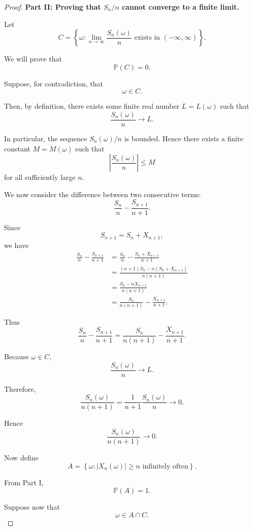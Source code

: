 \begin{proof}
\medskip

\noindent
\textbf{Part II: Proving that $S_n/n$ cannot converge to a finite limit.}

Let
\[
    C
    =
    \left\{
        \omega:
        \lim_{n\to\infty}\frac{S_n(\omega)}{n}
        \text{ exists in }(-\infty,\infty)
    \right\}.
\]

We will prove that
\[
    \mathbb{P}(C)=0.
\]

Suppose, for contradiction, that
\[
    \omega\in C.
\]

Then, by definition, there exists some finite real number $L=L(\omega)$
such that
\[
    \frac{S_n(\omega)}{n}\longrightarrow L.
\]

In particular, the sequence $S_n(\omega)/n$ is bounded. Hence there
exists a finite constant $M=M(\omega)$ such that
\[
    \left|\frac{S_n(\omega)}{n}\right|\leq M
\]
for all sufficiently large $n$.

We now consider the difference between two consecutive terms:
\[
    \frac{S_n}{n}
    -
    \frac{S_{n+1}}{n+1}.
\]

Since
\[
    S_{n+1}=S_n+X_{n+1},
\]
we have
\[
\begin{aligned}
    \frac{S_n}{n}
    -
    \frac{S_{n+1}}{n+1}
    &=
    \frac{S_n}{n}
    -
    \frac{S_n+X_{n+1}}{n+1}
    \\
    &=
    \frac{(n+1)S_n-n(S_n+X_{n+1})}
         {n(n+1)}
    \\
    &=
    \frac{S_n-nX_{n+1}}
         {n(n+1)}
    \\
    &=
    \frac{S_n}{n(n+1)}
    -
    \frac{X_{n+1}}{n+1}.
\end{aligned}
\]

Thus
\[
    \boxed{
    \frac{S_n}{n}
    -
    \frac{S_{n+1}}{n+1}
    =
    \frac{S_n}{n(n+1)}
    -
    \frac{X_{n+1}}{n+1}.
    }
\]

Because $\omega\in C$,
\[
    \frac{S_n(\omega)}{n}\longrightarrow L.
\]

Therefore,
\[
    \frac{S_n(\omega)}{n(n+1)}
    =
    \frac{1}{n+1}
    \frac{S_n(\omega)}{n}
    \longrightarrow0.
\]

Hence
\[
    \boxed{
    \frac{S_n(\omega)}{n(n+1)}
    \longrightarrow0.
    }
\]

Now define
\[
    A
    =
    \left\{
        \omega:
        |X_n(\omega)|\geq n
        \text{ infinitely often}
    \right\}.
\]

From Part I,
\[
    \mathbb{P}(A)=1.
\]

Suppose now that
\[
    \omega\in A\cap C.
\]


\end{proof}
